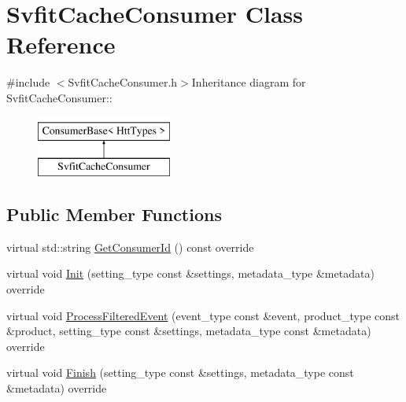 \hypertarget{classSvfitCacheConsumer}{
\section{SvfitCacheConsumer Class Reference}
\label{classSvfitCacheConsumer}
}


{\ttfamily \#include $<$SvfitCacheConsumer.h$>$}Inheritance diagram for SvfitCacheConsumer::\begin{figure}[H]
\begin{center}
\leavevmode
\includegraphics[height=2cm]{classSvfitCacheConsumer}
\end{center}
\end{figure}
\subsection*{Public Member Functions}
\begin{DoxyCompactItemize}
\item 
virtual std::string \hyperlink{classSvfitCacheConsumer_af25bb531a14a514c695f5e6a729b3541}{GetConsumerId} () const override
\item 
virtual void \hyperlink{classSvfitCacheConsumer_afcc829bb228ce3d9e736e2cab7749f65}{Init} (setting\_\-type const \&settings, metadata\_\-type \&metadata) override
\item 
virtual void \hyperlink{classSvfitCacheConsumer_a2195cb133b9f45c844b28294dbc7f476}{ProcessFilteredEvent} (event\_\-type const \&event, product\_\-type const \&product, setting\_\-type const \&settings, metadata\_\-type const \&metadata) override
\item 
virtual void \hyperlink{classSvfitCacheConsumer_a09d12f89cab4026e1db359f5cec7513b}{Finish} (setting\_\-type const \&settings, metadata\_\-type const \&metadata) override
\end{DoxyCompactItemize}


